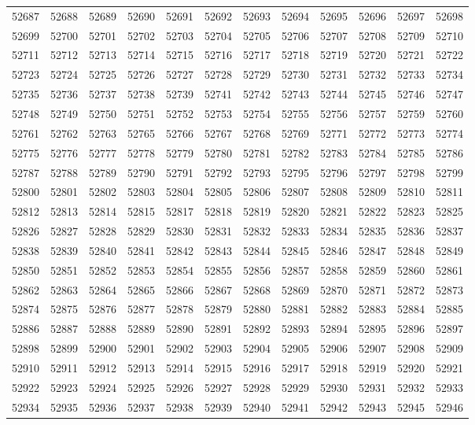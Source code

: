 \begin{center}
\begin{longtable}{llllllllllll}
52687 &52688 &52689 &52690 &52691 &52692 &52693 &52694 &52695 &52696 &52697 &52698 \\
52699 &52700 &52701 &52702 &52703 &52704 &52705 &52706 &52707 &52708 &52709 &52710 \\
52711 &52712 &52713 &52714 &52715 &52716 &52717 &52718 &52719 &52720 &52721 &52722 \\
52723 &52724 &52725 &52726 &52727 &52728 &52729 &52730 &52731 &52732 &52733 &52734 \\
52735 &52736 &52737 &52738 &52739 &52741 &52742 &52743 &52744 &52745 &52746 &52747 \\
52748 &52749 &52750 &52751 &52752 &52753 &52754 &52755 &52756 &52757 &52759 &52760 \\
52761 &52762 &52763 &52765 &52766 &52767 &52768 &52769 &52771 &52772 &52773 &52774 \\
52775 &52776 &52777 &52778 &52779 &52780 &52781 &52782 &52783 &52784 &52785 &52786 \\
52787 &52788 &52789 &52790 &52791 &52792 &52793 &52795 &52796 &52797 &52798 &52799 \\
52800 &52801 &52802 &52803 &52804 &52805 &52806 &52807 &52808 &52809 &52810 &52811 \\
52812 &52813 &52814 &52815 &52817 &52818 &52819 &52820 &52821 &52822 &52823 &52825 \\
52826 &52827 &52828 &52829 &52830 &52831 &52832 &52833 &52834 &52835 &52836 &52837 \\
52838 &52839 &52840 &52841 &52842 &52843 &52844 &52845 &52846 &52847 &52848 &52849 \\
52850 &52851 &52852 &52853 &52854 &52855 &52856 &52857 &52858 &52859 &52860 &52861 \\
52862 &52863 &52864 &52865 &52866 &52867 &52868 &52869 &52870 &52871 &52872 &52873 \\
52874 &52875 &52876 &52877 &52878 &52879 &52880 &52881 &52882 &52883 &52884 &52885 \\
52886 &52887 &52888 &52889 &52890 &52891 &52892 &52893 &52894 &52895 &52896 &52897 \\
52898 &52899 &52900 &52901 &52902 &52903 &52904 &52905 &52906 &52907 &52908 &52909 \\
52910 &52911 &52912 &52913 &52914 &52915 &52916 &52917 &52918 &52919 &52920 &52921 \\
52922 &52923 &52924 &52925 &52926 &52927 &52928 &52929 &52930 &52931 &52932 &52933 \\
52934 &52935 &52936 &52937 &52938 &52939 &52940 &52941 &52942 &52943 &52945 &52946 \\

\end{longtable}
\end{center}
